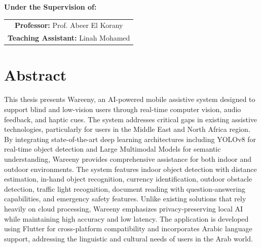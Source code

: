\documentclass[a4paper]{report}
\begin{document}
\begin{titlepage}
    {\large\textbf{Under the Supervision of:}\par}
    \vspace{0.2cm}
    \begin{tabular}{c}
        {\large\textbf{Professor:} Prof. Abeer El Korany} \\[0.3cm]
        {\large\textbf{Teaching Assistant:} Linah Mohamed} \\
    \end{tabular}
    
    \vfill
    
    \noindent{}
    
\end{titlepage}


\chapter*{Abstract}
This thesis presents Wareeny, an AI-powered mobile assistive system designed to support blind and low-vision users through real-time computer vision, audio feedback, and haptic cues. The system addresses critical gaps in existing assistive technologies, particularly for users in the Middle East and North Africa region. By integrating state-of-the-art deep learning architectures including YOLOv8 for real-time object detection and Large Multimodal Models for semantic understanding, Wareeny provides comprehensive assistance for both indoor and outdoor environments. The system features indoor object detection with distance estimation, in-hand object recognition, currency identification, outdoor obstacle detection, traffic light recognition, document reading with question-answering capabilities, and emergency safety features. Unlike existing solutions that rely heavily on cloud processing, Wareeny emphasizes privacy-preserving local AI while maintaining high accuracy and low latency. The application is developed using Flutter for cross-platform compatibility and incorporates Arabic language support, addressing the linguistic and cultural needs of users in the Arab world.
\end{document}
